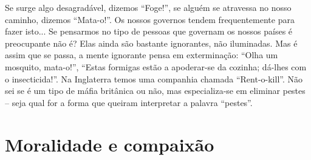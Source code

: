 Se surge algo desagradável, dizemos “Foge!”, se alguém
se atravessa no nosso caminho, dizemos “Mata-o!”. Os nossos governos tendem frequentemente para fazer isto... Se pensarmos no tipo de pessoas que governam os nossos países é
preocupante não é? Elas ainda são bastante ignorantes, não
iluminadas. Mas é assim que se passa, a mente ignorante
pensa em exterminação: “Olha um mosquito, mata-o!”,
“Estas formigas estão a apoderar-se da cozinha; dá-lhes com
o insecticida!”. Na Inglaterra temos uma companhia chamada
“Rent-o-kill”. Não sei se é um tipo de máfia britânica ou não,
mas especializa-se em eliminar pestes – seja qual for a forma
que queiram interpretar a palavra “pestes”.

\section{Moralidade e compaixão}

